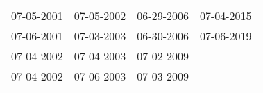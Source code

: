 \begin{supertabular}{llll}
 07-05-2001 &  07-05-2002 &  06-29-2006 &  07-04-2015 \\
 07-06-2001 &  07-03-2003 &  06-30-2006 &  07-06-2019 \\
 07-04-2002 &  07-04-2003 &  07-02-2009 &             \\
 07-04-2002 &  07-06-2003 &  07-03-2009 &             \\
\end{supertabular}
